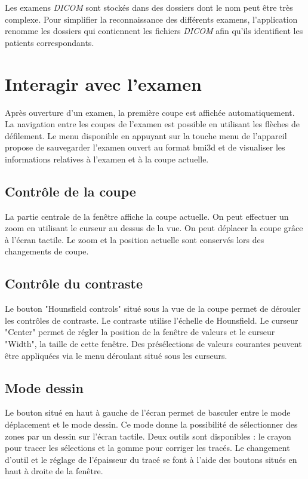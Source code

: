 \begin{note} %
Les examens \emph{DICOM} sont stockés dans des dossiers dont le nom peut être très complexe. Pour simplifier la reconnaissance des différents examens, l'application renomme les dossiers qui contiennent les fichiers \emph{DICOM} afin qu'ils identifient les patients correspondants.
\end{note}

\section{Interagir avec l'examen} \label{exam-interaction}

Après ouverture d'un examen, la première coupe est affichée automatiquement. La navigation entre les coupes de l'examen est possible en utilisant les flèches de défilement. Le menu disponible en appuyant sur la touche menu de l'appareil propose de sauvegarder l'examen ouvert au format bmi3d et de visualiser les informations relatives à l'examen et à la coupe actuelle.

\subsection{Contrôle de la coupe}
La partie centrale de la fenêtre affiche la coupe actuelle. On peut effectuer un zoom en utilisant le curseur au dessus de la vue. On peut déplacer la coupe grâce à l'écran tactile. Le zoom et la position actuelle sont conservés lors des changements de coupe.

\subsection{Contrôle du contraste}
Le bouton "Hounsfield controls" situé sous la vue de la coupe permet de dérouler les contrôles de contraste. Le contraste utilise l'échelle de Hounsfield. Le curseur "Center" permet de régler la position de la fenêtre de valeurs et le curseur "Width", la taille de cette fenêtre. Des présélections de valeurs courantes peuvent être appliquées via le menu déroulant situé sous les curseurs.

\subsection{Mode dessin}
Le bouton situé en haut à gauche de l'écran permet de basculer entre le mode déplacement et le mode dessin. Ce mode donne la possibilité de sélectionner des zones par un dessin sur l'écran tactile. Deux outils sont disponibles : le crayon pour tracer les sélections et la gomme pour corriger les tracés. Le changement d'outil et le réglage de l'épaisseur du tracé se font à l'aide des boutons situés en haut à droite de la fenêtre.
